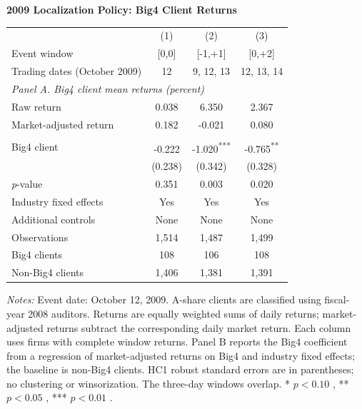 \documentclass[10pt]{article}
\newcommand{\sym}[1]{\textsuperscript{#1}}
\begin{document}
\fontsize{10}{12}\selectfont\setlength{\parindent}{0pt}
\noindent\textbf{2009 Localization Policy: Big4 Client Returns}\par\medskip
\setlength{\tabcolsep}{3pt}\renewcommand{\arraystretch}{1.15}
\noindent\begin{tabular*}{\textwidth}{@{\extracolsep{\fill}}lccc@{}}
\toprule
 & (1) & (2) & (3) \\
Event window & [0,0] & [-1,+1] & [0,+2] \\
Trading dates (October 2009) & 12 & 9, 12, 13 & 12, 13, 14 \\
\midrule
\multicolumn{4}{l}{\textit{Panel A. Big4 client mean returns (percent)}} \\
Raw return & 0.038 & 6.350 & 2.367 \\
Market-adjusted return & 0.182 & -0.021 & 0.080 \\ \addlinespace
\multicolumn{4}{l}{\textit{Panel B. Big4 minus non-Big4 (percentage points)}} \\
Big4 client & -0.222\sym{} & -1.020\sym{***} & -0.765\sym{**} \\
 & (0.238) & (0.342) & (0.328) \\
\textit{p}-value & 0.351 & 0.003 & 0.020 \\ \addlinespace
Industry fixed effects & Yes & Yes & Yes \\
Additional controls & None & None & None \\
Observations & 1,514 & 1,487 & 1,499 \\
Big4 clients & 108 & 106 & 108 \\
Non-Big4 clients & 1,406 & 1,381 & 1,391 \\
\bottomrule
\end{tabular*}
\par\medskip\fontsize{9}{11}\selectfont\textit{Notes:} Event date: October 12, 2009. A-share clients are classified using fiscal-year 2008 auditors. Returns are equally weighted sums of daily returns; market-adjusted returns subtract the corresponding daily market return. Each column uses firms with complete window returns. Panel B reports the Big4 coefficient from a regression of market-adjusted returns on Big4 and industry fixed effects; the baseline is non-Big4 clients. HC1 robust standard errors are in parentheses; no clustering or winsorization. The three-day windows overlap. * \ensuremath{p<0.10} , ** \ensuremath{p<0.05} , *** \ensuremath{p<0.01} .
\end{document}
